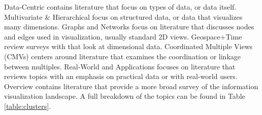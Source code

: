 Data-Centric contains literature that focus on types of data, or data itself. Multivariate \& Hierarchical focus on structured data, or data that visualizes many dimensions. Graphs and Networks focus on literature that discusses nodes and edges used in visualization, usually standard 2D views. Geospace+Time review surveys with that look at dimensional data.  Coordinated Multiple Views (CMVs) centers around literature that examines the coordination or linkage between multiples. Real-World and Applications focuses on literature that reviews topics with an emphasis on practical data or with real-world users. Overview contains literature that provide a more broad survey of the information visualization landscape. A full breakdown of the topics can be found in Table \ref{table:clusters}.

